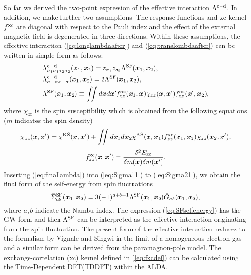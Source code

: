 So far we derived the two-point expression of the effective interaction $\Lambda^{\rm c - \rm d}$.
In addition, we make further two assumptions: The response functions and xc kernel $f^{\rm xc}$ are
diagonal with respect to the Pauli index and the effect of the external magnetic field is degenerated
in three directions. Within these assumptions, the effective interaction (\ref{eq:longlambdaafter}) and
(\ref{eq:translombdaafter}) can be written in simple form as follows:
%
\begin{equation}
	\begin{split}
	&\Lambda^{\rm c - \rm d}_{\sigma_1\sigma_1\sigma_2\sigma_2}(\bm x_1, \bm x_2) = 
	z_{\sigma_1}z_{\sigma_2}\Lambda^{\rm SF}(\bm x_1,\bm x_2), \\
	&\Lambda^{\rm c - \rm d}_{\sigma-\sigma\sigma-\sigma}(\bm x_1, \bm x_2) = 
	2\Lambda^{\rm SF}(\bm x_1,\bm x_2), \\
	&\Lambda^{\rm SF}(\bm x_1,\bm x_2) \equiv \iint d\bm x d\bm x'
	f^{\rm xc}_{zz}(\bm x_1,\bm x)\chi_{zz}(\bm x,\bm x')f^{\rm xc}_{zz}(\bm x',\bm x_2),
	\label{eq:finallambda}
\end{split}
\end{equation}
%
where $\chi_{zz}$ is the spin susceptibility which is obtained from the following equations
($m$ indicates the spin density)
%
\begin{equation}
	\chi_{zz}(\bm x,\bm x') = \chi^{\rm KS}(\bm x,\bm x') + 
	\iint d\bm x_1 d\bm x_2 \chi^{\rm KS}(\bm x, \bm x_1)f^{\rm xc}_{zz}(\bm x_1, \bm x_2)
	\chi_{zz}(\bm x_2,\bm x'),
	\label{eq:chis}
\end{equation}
%
\begin{equation}
	f^{\rm xc}_{zz}(\bm x,\bm x') = \frac{\delta^2 E_{\rm xc}}{\delta m(\bm x) \delta m(\bm x')}.
	\label{eq:fxcdef}
\end{equation}
%
Inserting (\ref{eq:finallambda}) into (\ref{eq:Sigma11}) to (\ref{eq:Sigma21}), we obtain the 
final form of the self-energy from spin fluctuations
%
\begin{equation}
	\bar{\Sigma}^{\rm SF}_{ab}(\bm x_1,\bm x_2) = 3(-1)^{a+b+1}
	\Lambda^{\rm SF}(\bm x_1, \bm x_2) \bar{G}_{ab}(\bm x_1, \bm x_2),
	\label{eq:SFselfenergy}
\end{equation}
%
where $a, b$ indicate the Nambu index.
The expression (\ref{eq:SFselfenergy}) has the GW form and then $\Lambda^{\rm SF}$ can be interpreted
as the effective interaction originating from the spin fluctuation.
The present form of the effective interaction reduces to the formalism by Vignale and Singwi\cite{Vignale1985} 
in the limit of a homogeneous electron gas and a similar form can be derived from the 
paramagnon-pole model\cite{Zhu1986}.
The exchange-correlation (xc) kernel defined in (\ref{eq:fxcdef}) can be calculated using the Time-Dependent DFT(TDDFT)
\cite{Runge1984} within the ALDA.

